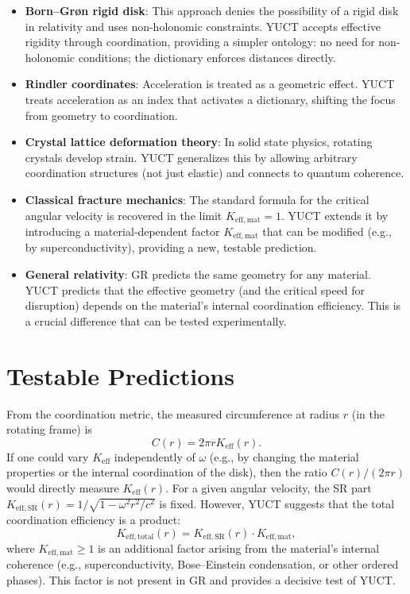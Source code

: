 \documentclass[12pt,a4paper]{article}
\begin{document}
	\begin{itemize}
		\item \textbf{Born--Gr{\o}n rigid disk}: This approach denies the possibility of a rigid disk in relativity and uses non-holonomic constraints. YUCT accepts effective rigidity through coordination, providing a simpler ontology: no need for non-holonomic conditions; the dictionary enforces distances directly.
		\item \textbf{Rindler coordinates}: Acceleration is treated as a geometric effect. YUCT treats acceleration as an index that activates a dictionary, shifting the focus from geometry to coordination.
		\item \textbf{Crystal lattice deformation theory}: In solid state physics, rotating crystals develop strain. YUCT generalizes this by allowing arbitrary coordination structures (not just elastic) and connects to quantum coherence.
		\item \textbf{Classical fracture mechanics}: The standard formula for the critical angular velocity is recovered in the limit \(K_{\mathrm{eff,mat}} = 1\). YUCT extends it by introducing a material‑dependent factor \(K_{\mathrm{eff,mat}}\) that can be modified (e.g., by superconductivity), providing a new, testable prediction.
		\item \textbf{General relativity}: GR predicts the same geometry for any material. YUCT predicts that the effective geometry (and the critical speed for disruption) depends on the material's internal coordination efficiency. This is a crucial difference that can be tested experimentally.
	\end{itemize}
	
	\section{Testable Predictions}
	\label{sec:predict}
	
	From the coordination metric, the measured circumference at radius \(r\) (in the rotating frame) is
	\[
	C(r) = 2\pi r K_{\mathrm{eff}}(r).
	\]
	If one could vary \(K_{\mathrm{eff}}\) independently of \(\omega\) (e.g., by changing the material properties or the internal coordination of the disk), then the ratio \(C(r)/(2\pi r)\) would directly measure \(K_{\mathrm{eff}}(r)\). For a given angular velocity, the SR part \(K_{\mathrm{eff,SR}}(r) = 1/\sqrt{1-\omega^2 r^2/c^2}\) is fixed. However, YUCT suggests that the total coordination efficiency is a product:
	\[
	K_{\mathrm{eff,total}}(r) = K_{\mathrm{eff,SR}}(r) \cdot K_{\mathrm{eff,mat}},
	\]
	where \(K_{\mathrm{eff,mat}} \ge 1\) is an additional factor arising from the material's internal coherence (e.g., superconductivity, Bose–Einstein condensation, or other ordered phases). This factor is not present in GR and provides a decisive test of YUCT.
	
\end{document}
